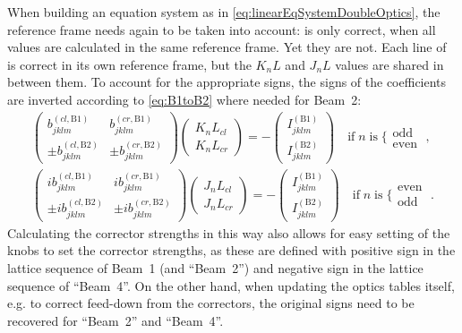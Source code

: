 When building an equation system as in \cref{eq:linearEqSystemDoubleOptics}, the reference frame needs again to be taken into account:
 is only correct, when all values are calculated in the same reference frame.  
Yet they are not.
Each line  of  is correct in its own reference frame, but the $K_nL$ and $J_nL$ values are shared in between them. 
To account for the appropriate signs, the signs of the coefficients are inverted according to \cref{eq:B1toB2} where needed for Beam~2: 
%
\begin{equation}    
    \label{eq:linearEqSystemDoubleOpticsBeamDirection}
    \begin{split}
        \begin{pmatrix}
            b_{jklm}^{(cl, \text{B1})} & b_{jklm}^{(cr, \text{B1})} \\
            \pm b_{jklm}^{(cl, \text{B2})} & \pm b_{jklm}^{(cr, \text{B2})}
        \end{pmatrix}
        \begin{pmatrix}
            K_{n}L_{cl} \\ 
            K_{n}L_{cr}
        \end{pmatrix}
        = -
        \begin{pmatrix}
            I^{(\text{B1})}_{jklm} \\ 
            I^{(\text{B2})}_{jklm} 
        \end{pmatrix} 
        \quad \text{if} \; n \; \text{is} \; \{\substack{\text{odd}\\\text{even}} \;,
        \\ 
        \begin{pmatrix}
            ib_{jklm}^{(cl, \text{B1})} & ib_{jklm}^{(cr, \text{B1})} \\
            \pm ib_{jklm}^{(cl, \text{B2})} & \pm ib_{jklm}^{(cr, \text{B2})}
        \end{pmatrix}
        \begin{pmatrix}
            J_{n}L_{cl} \\ 
            J_{n}L_{cr}
        \end{pmatrix}
        = -
        \begin{pmatrix}
            I^{(\text{B1})}_{jklm} \\ 
            I^{(\text{B2})}_{jklm} 
        \end{pmatrix} 
        \quad \text{if} \; n \; \text{is} \; \{\substack{\text{even}\\\text{odd}} \;.
    \end{split}
\end{equation}
%
Calculating the corrector strengths in this way also allows for easy setting of the  knobs
to set the corrector strengths, as these are defined with positive sign in the lattice sequence of Beam~1 (and ``Beam~2'')
and negative sign in the lattice sequence of ``Beam~4''.
On the other hand, when updating the optics tables itself, e.g. to correct feed-down from the correctors, 
the original signs need to be recovered for ``Beam~2'' and ``Beam~4''.

